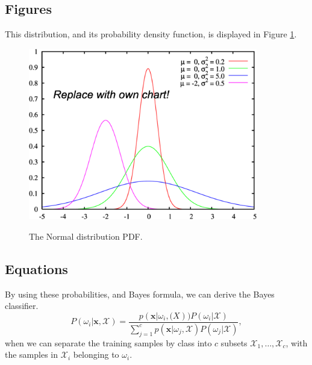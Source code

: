 \subsection{Figures}
This distribution, and its probability density function, is displayed in Figure \ref{fig:gaussian_distr_pdf}.
\begin{figure}[ht]
	\center\includegraphics[width=10cm]{images/normal_distr_pdf}	
	\label{fig:gaussian_distr_pdf}
	\caption{The Normal distribution PDF.}
\end{figure}

\subsection{Equations}
By using these probabilities, and Bayes formula, we can derive the Bayes classifier.
\begin{equation}
	P(\omega_i | \boldsymbol{x}, \mathcal{X}) = \frac{p(\boldsymbol{x}|\omega_i, \mathcal(X))P(\omega_i|\mathcal{X})}{\sum_{j=1}^{c}p(\boldsymbol{x}|\omega_j, \mathcal{X})P(\omega_j|\mathcal{X})},
	\label{eq:bayes_formula_1}
\end{equation}
when we can separate the training samples by class into $c$ subsets $\mathcal{X}_1, \ldots, \mathcal{X}_c$, with the samples in $\mathcal{X}_i$ belonging to $\omega_i$.

